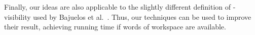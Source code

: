 \documentclass[11pt, a4paper]{article}
\begin{document}
Finally, our ideas are also applicable to the slightly
different definition of -visibility used by Bajuelos et 
al.~\cite{bajuelos2012hybrid}. Thus, our techniques can be used to 
improve their result, achieving  running time if 
 words of workspace are available.



\end{document}
